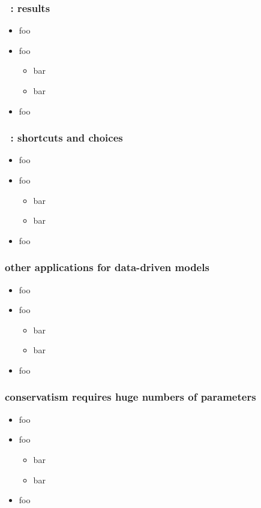 \documentclass[pdftex]{beamer}
\begin{document}
\begin{frame}
  \frametitle{\tc\ \credits: results}
  \begin{itemize}
  \item foo
  \item foo
    \begin{itemize}
    \item bar
    \item bar
    \end{itemize}
  \item foo
  \end{itemize}
\end{frame}

\begin{frame}
  \frametitle{\tc\ \credits: shortcuts and choices}
  \begin{itemize}
  \item foo
  \item foo
    \begin{itemize}
    \item bar
    \item bar
    \end{itemize}
  \item foo
  \end{itemize}
\end{frame}

\begin{frame}
  \frametitle{other applications for data-driven models}
  \begin{itemize}
  \item foo
  \item foo
    \begin{itemize}
    \item bar
    \item bar
    \end{itemize}
  \item foo
  \end{itemize}
\end{frame}

\begin{frame}
  \frametitle{conservatism requires huge numbers of parameters}
  \begin{itemize}
  \item foo
  \item foo
    \begin{itemize}
    \item bar
    \item bar
    \end{itemize}
  \item foo
  \end{itemize}
\end{frame}
\end{document}
